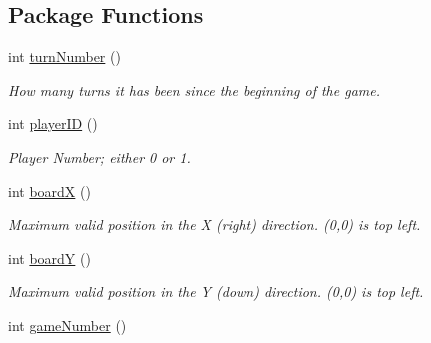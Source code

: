 \subsection*{Package Functions}
\begin{DoxyCompactItemize}
\item 
\hypertarget{classBaseAI_a19ade7391bfe101884a35f48fb840199}{
int \hyperlink{classBaseAI_a19ade7391bfe101884a35f48fb840199}{turnNumber} ()}
\label{classBaseAI_a19ade7391bfe101884a35f48fb840199}

\begin{DoxyCompactList}\small\item\em How many turns it has been since the beginning of the game. \item\end{DoxyCompactList}\item 
\hypertarget{classBaseAI_a16aab1036653c8f8fb5370cf2f6a3e10}{
int \hyperlink{classBaseAI_a16aab1036653c8f8fb5370cf2f6a3e10}{playerID} ()}
\label{classBaseAI_a16aab1036653c8f8fb5370cf2f6a3e10}

\begin{DoxyCompactList}\small\item\em Player Number; either 0 or 1. \item\end{DoxyCompactList}\item 
\hypertarget{classBaseAI_a298c9ca7f754329796f45e38383c2c0a}{
int \hyperlink{classBaseAI_a298c9ca7f754329796f45e38383c2c0a}{boardX} ()}
\label{classBaseAI_a298c9ca7f754329796f45e38383c2c0a}

\begin{DoxyCompactList}\small\item\em Maximum valid position in the X (right) direction. (0,0) is top left. \item\end{DoxyCompactList}\item 
\hypertarget{classBaseAI_aaf123aaebe77eeda93c3d78d5783f541}{
int \hyperlink{classBaseAI_aaf123aaebe77eeda93c3d78d5783f541}{boardY} ()}
\label{classBaseAI_aaf123aaebe77eeda93c3d78d5783f541}

\begin{DoxyCompactList}\small\item\em Maximum valid position in the Y (down) direction. (0,0) is top left. \item\end{DoxyCompactList}\item 
\hypertarget{classBaseAI_a50d3091db33b93c6f7c2d11dd64b4c7a}{
int \hyperlink{classBaseAI_a50d3091db33b93c6f7c2d11dd64b4c7a}{gameNumber} ()}
\label{classBaseAI_a50d3091db33b93c6f7c2d11dd64b4c7a}


\end{DoxyCompactItemize}

